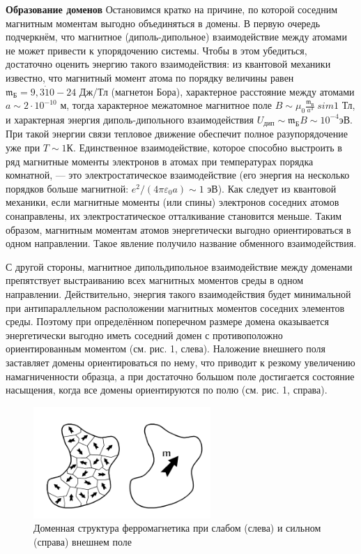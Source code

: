 \documentclass[12pt,a4paper]{article}
\begin{document}
\textbf{Образование доменов}
Остановимся кратко на причине, по которой соседним магнитным моментам выгодно объединяться в домены.
В первую очередь подчеркнём, что магнитное (диполь-дипольное) взаимодействие между атомами не может привести к упорядочению системы. Чтобы в этом убедиться, достаточно оценить энергию такого взаимодействия: из квантовой механики известно, что магнитный момент
атома по порядку величины равен $\mathfrak{m}_\text{Б} = 9,3 \dot 10-24$ Дж/Тл (магнетон
Бора), характерное расстояние между атомами $a \sim 2 \cdot 10^{-10}$ м, тогда
характерное межатомное магнитное поле $B \sim \mu_0 \frac{\mathfrak{m}_\text{Б}}{a^3} \ sim 1$ Тл, 
и характерная энергия диполь-дипольного взаимодействия $U_\text{дип} \sim \mathfrak{m}_\text{Б} B \sim 10^{-4} $эВ.
При такой энергии связи тепловое движение обеспечит полное разупорядочение уже при $T \sim 1$К.
Единственное взаимодействие, которое способно выстроить в ряд
магнитные моменты электронов в атомах при температурах порядка
комнатной, — это электростатическое взаимодействие (его энергия на
несколько порядков больше магнитной: $e^2/(4\pi \varepsilon_0 a) \sim 1$ эВ). Как следует
из квантовой механики, если магнитные моменты (или спины) электронов соседних атомов сонаправлены, их электростатическое отталкивание становится меньше. Таким образом, магнитным моментам атомов энергетически выгодно ориентироваться в одном направлении. Такое явление получило название обменного взаимодействия.

С другой стороны, магнитное дипольдипольное взаимодействие между доменами препятствует выстраиванию всех
магнитных моментов среды в одном направлении. Действительно, энергия такого взаимодействия будет минимальной при антипараллельном расположении магнитных моментов соседних элементов среды. Поэтому при определённом поперечном размере домена оказывается энергетически выгодно иметь соседний домен с противоположно ориентированным моментом (см. рис. 1, слева).
Наложение внешнего поля заставляет домены ориентироваться по нему,
что приводит к резкому увеличению намагниченности образца, а при достаточно большом поле достигается состояние насыщения, когда все
домены ориентируются по полю (см. рис. 1, справа).



\begin{figure}[h!]
    \centering
    \includegraphics[width=0.6\textwidth]{structure.png}
    \caption{Доменная структура ферромагнетика при слабом (слева) и сильном (справа)
    внешнем поле}
\end{figure}
\end{document}
